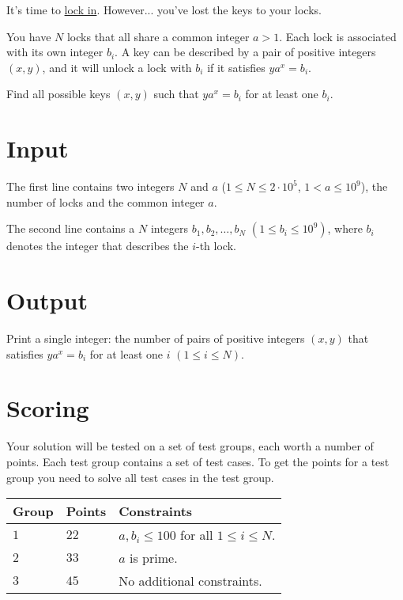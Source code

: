 
\noindent
It's time to \uline{lock in}. However... you've lost the keys to your locks.

You have $N$ locks that all share a common integer $a > 1$. Each lock is associated with its own integer $b_i$.
A key can be described by a pair of positive integers $(x,y)$, and it will unlock a lock with $b_i$ if it satisfies $ya^x = b_i$.

Find all possible keys $(x,y)$ such that $ya^x = b_i$ for at least one $b_i$.

\section*{Input}
The first line contains two integers $N$ and $a$ ($1 \leq N \leq 2 \cdot 10^5$, $1 < a \leq 10^9$), the number of locks and the common integer $a$.

The second line contains a $N$ integers $b_1, b_2, \dots, b_N$ $(1 \leq b_i \leq 10^9)$, where $b_i$ denotes the integer that describes the $i$-th lock.

\section*{Output}
Print a single integer: the number of pairs of positive integers $(x,y)$ that satisfies $ya^x = b_i$ for at least one $i$ $(1\leq i \leq N)$.

\section*{Scoring}
Your solution will be tested on a set of test groups, each worth a number of points. Each test group contains
a set of test cases. To get the points for a test group you need to solve all test cases in the test group.

\noindent
\begin{tabular}{| l | l | p{12cm} |}
  \hline
  \textbf{Group} & \textbf{Points} & \textbf{Constraints} \\ \hline
  $1$    & $22$       & $a, b_i \leq 100$ for all $1 \leq i \leq N$. \\ \hline
  $2$    & $33$       & $a$ is prime. \\ \hline
  $3$    & $45$       & No additional constraints. \\ \hline
\end{tabular}

